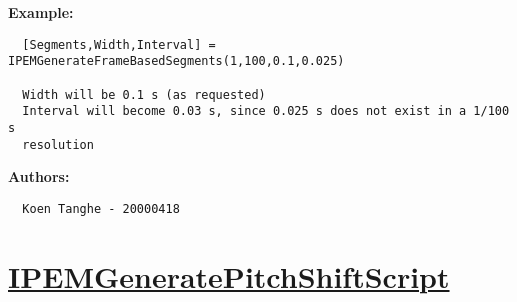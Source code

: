 \textbf{Example:}
\begin{verbatim}  [Segments,Width,Interval] = IPEMGenerateFrameBasedSegments(1,100,0.1,0.025)

  Width will be 0.1 s (as requested)
  Interval will become 0.03 s, since 0.025 s does not exist in a 1/100 s
  resolution 

\end{verbatim}
\textbf{Authors:}
\begin{verbatim}  Koen Tanghe - 20000418
\end{verbatim}


\newpage
\section*{\hyperlink{Concepts:IPEMGeneratePitchShiftScript}{IPEMGeneratePitchShiftScript}}
\hypertarget{FuncRef:IPEMGeneratePitchShiftScript}{}


